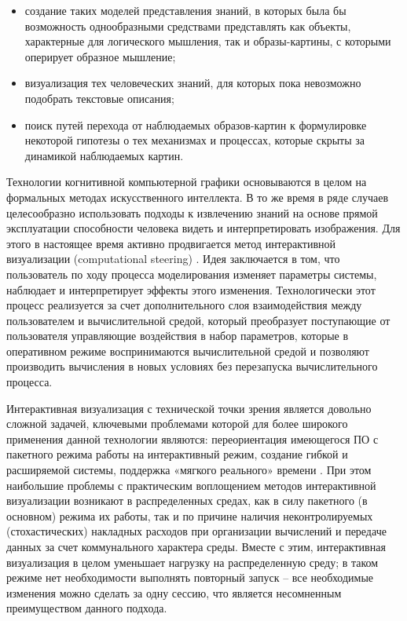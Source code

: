 \begin{itemize}
	\item	создание таких моделей представления знаний, в которых была бы 
			возможность однообразными средствами представлять как объекты, 
			характерные для логического мышления, так и образы-картины, с 
			которыми оперирует образное мышление;
	\item	визуализация тех человеческих знаний, для которых пока 
			невозможно подобрать текстовые описания;
	\item	поиск путей перехода от наблюдаемых образов-картин 
			к формулировке некоторой гипотезы о тех механизмах 
			и процессах, которые скрыты за динамикой наблюдаемых картин.
\end{itemize}

Технологии когнитивной компьютерной графики основываются в целом на формальных методах искусственного интеллекта. В то же время в ряде случаев целесообразно использовать подходы к извлечению знаний на основе прямой эксплуатации способности человека видеть и интерпретировать изображения. Для этого в настоящее время активно продвигается метод интерактивной визуализации (computational steering) \citep{dk66}\citep{dk67}. Идея заключается в том, что пользователь по ходу процесса моделирования изменяет параметры системы, наблюдает и интерпретирует эффекты этого изменения. Технологически этот процесс реализуется за счет дополнительного слоя взаимодействия между пользователем и вычислительной средой, который преобразует поступающие от пользователя управляющие воздействия в набор параметров, которые в оперативном режиме воспринимаются вычислительной средой и позволяют производить вычисления в новых условиях без перезапуска вычислительного процесса.

Интерактивная визуализация с технической точки зрения является довольно сложной задачей, ключевыми проблемами которой для более широкого применения данной технологии являются: переориентация имеющегося ПО с пакетного режима работы на интерактивный режим, создание гибкой и расширяемой системы, поддержка «мягкого реального» времени \citep{dk68}. При этом наибольшие проблемы с практическим воплощением методов интерактивной визуализации возникают в распределенных средах, как в силу пакетного (в основном) режима их работы, так и по причине наличия неконтролируемых (стохастических) накладных расходов при организации вычислений и передаче данных за счет коммунального характера среды. Вместе с этим, интерактивная визуализация в целом уменьшает нагрузку на распределенную среду; в таком режиме нет необходимости выполнять повторный запуск – все необходимые изменения можно сделать за одну сессию, что является несомненным преимуществом данного подхода.


